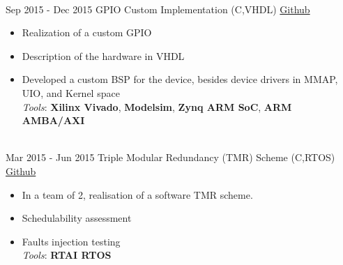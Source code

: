 \documentclass[letterpaper]{twentysecondcv} %
\begin{document}
\begin{twenty}
{        }\\
    \twentyitem
    	{Sep 2015 -}
		{Dec 2015}
        {GPIO Custom Implementation (C,VHDL)}
        {\href{https://github.com/artic92/gpio-zynq-7000}{Github}}
        {}
        {
            \begin{itemize}
                \item Realization of a custom GPIO
                \item Description of the hardware in VHDL
                \item Developed a custom BSP for the device, besides device drivers in MMAP, UIO, and Kernel space \\
                \textit{Tools}: \textbf{Xilinx Vivado}, \textbf{Modelsim}, \textbf{Zynq ARM SoC}, \textbf{ARM AMBA/AXI}
		    \end{itemize}
        }\\
    \twentyitem
    	{Mar 2015 -}
		{Jun 2015}
        {Triple Modular Redundancy (TMR) Scheme (C,RTOS)}
        {\href{https://github.com/artic92/tmr_rtai}{Github}}
        {}
        {
        {
            \begin{itemize}
                \item In a team of 2, realisation of a software TMR scheme.
                \item Schedulability assessment
                \item Faults injection testing \\
                \textit{Tools}: \textbf{RTAI RTOS}
		    \end{itemize}
		}
        }
\end{twenty}

\end{document}
